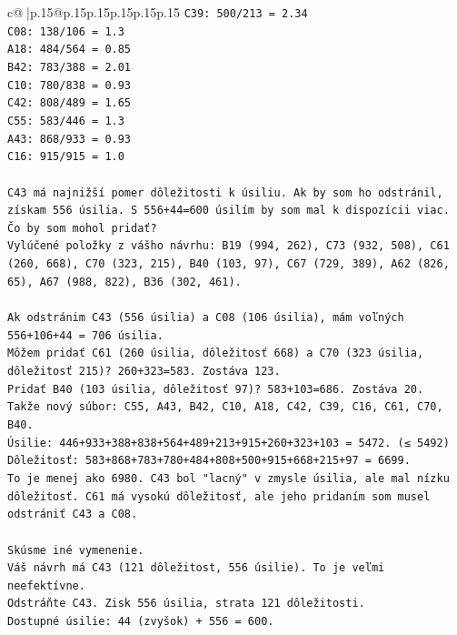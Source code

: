 \documentclass{article}
\begin{document}
{\begin{supertabular}{c@{$\;$}|p{.15\linewidth}@{}p{.15\linewidth}p{.15\linewidth}p{.15\linewidth}p{.15\linewidth}p{.15\linewidth}}
{{{\texttt{C39: 500/213 = 2.34} \\
\texttt{C08: 138/106 = 1.3} \\
\texttt{A18: 484/564 = 0.85} \\
\texttt{B42: 783/388 = 2.01} \\
\texttt{C10: 780/838 = 0.93} \\
\texttt{C42: 808/489 = 1.65} \\
\texttt{C55: 583/446 = 1.3} \\
\texttt{A43: 868/933 = 0.93} \\
\texttt{C16: 915/915 = 1.0} \\
\\ 
\texttt{C43 má najnižší pomer dôležitosti k úsiliu. Ak by som ho odstránil, získam 556 úsilia. S 556+44=600 úsilím by som mal k dispozícii viac.} \\
\texttt{Čo by som mohol pridať?} \\
\texttt{Vylúčené položky z vášho návrhu: B19 (994, 262), C73 (932, 508), C61 (260, 668), C70 (323, 215), B40 (103, 97), C67 (729, 389), A62 (826, 65), A67 (988, 822), B36 (302, 461).} \\
\\ 
\texttt{Ak odstránim C43 (556 úsilia) a C08 (106 úsilia), mám voľných 556+106+44 = 706 úsilia.} \\
\texttt{Môžem pridať C61 (260 úsilia, dôležitosť 668) a C70 (323 úsilia, dôležitosť 215)? 260+323=583. Zostáva 123.} \\
\texttt{Pridať B40 (103 úsilia, dôležitosť 97)? 583+103=686. Zostáva 20.} \\
\texttt{Takže nový súbor: C55, A43, B42, C10, A18, C42, C39, C16, C61, C70, B40.} \\
\texttt{Úsilie: 446+933+388+838+564+489+213+915+260+323+103 = 5472. (≤ 5492)} \\
\texttt{Dôležitosť: 583+868+783+780+484+808+500+915+668+215+97 = 6699.} \\
\texttt{To je menej ako 6980. C43 bol "lacný" v zmysle úsilia, ale mal nízku dôležitosť. C61 má vysokú dôležitosť, ale jeho pridaním som musel odstrániť C43 a C08.} \\
\\ 
\texttt{Skúsme iné vymenenie.} \\
\texttt{Váš návrh má C43 (121 dôležitost, 556 úsilie). To je veľmi neefektívne.} \\
\texttt{Odstráňte C43. Zisk 556 úsilia, strata 121 dôležitosti.} \\
\texttt{Dostupné úsilie: 44 (zvyšok) + 556 = 600.} \\
}}}
\end{supertabular}}
\end{document}
